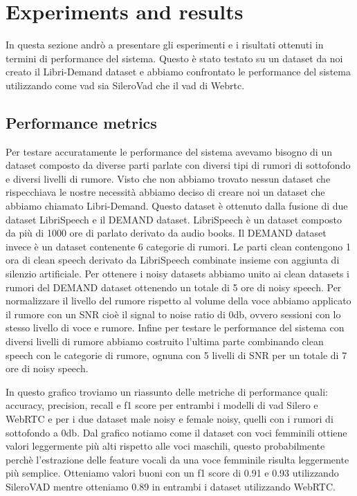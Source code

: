 \documentclass[12pt]{article}
\begin{document}
\section{Experiments and results}

In questa sezione andrò a presentare gli esperimenti e i risultati ottenuti in termini di performance del sistema. Questo è stato testato su un dataset da noi creato il Libri-Demand dataset e abbiamo confrontato le performance del sistema utilizzando come vad sia SileroVad che il vad di Webrtc. 

\subsection{Performance metrics}

Per testare accuratamente le performance del sistema avevamo bisogno di un dataset composto da diverse parti parlate con diversi tipi di rumori di sottofondo e diversi livelli di rumore. Visto che non abbiamo trovato nessun dataset che rispecchiava le nostre necessità abbiamo deciso di creare noi un dataset che abbiamo chiamato Libri-Demand. Questo dataset è ottenuto dalla fusione di due dataset LibriSpeech e il DEMAND dataset. LibriSpeech è un dataset composto da più di 1000 ore di parlato derivato da audio books. Il DEMAND dataset invece è un dataset contenente 6 categorie di rumori.
Le parti clean contengono 1 ora di clean speech derivato da LibriSpeech combinate insieme con aggiunta di silenzio artificiale. Per ottenere i noisy datasets abbiamo unito ai clean datasets i rumori del DEMAND dataset ottenendo un totale di 5 ore di noisy speech. Per normalizzare il livello del rumore rispetto al volume della voce abbiamo applicato il rumore con un SNR cioè il signal to noise ratio di 0db, ovvero sessioni con lo stesso livello di voce e rumore. Infine per testare le performance del sistema con diversi livelli di rumore abbiamo costruito l'ultima parte combinando clean speech con le categorie di rumore, ognuna con 5 livelli di SNR per un totale di 7 ore di noisy speech.

In questo grafico troviamo un riassunto delle metriche di performance quali: accuracy, precision, recall e f1 score per entrambi i modelli di vad Silero e WebRTC e per i due dataset male noisy e female noisy, quelli con i rumori di sottofondo a 0db. Dal grafico notiamo come il dataset con voci femminili ottiene valori leggermente più alti rispetto alle voci maschili, questo probabilmente perchè l'estrazione delle feature vocali da una voce femminile risulta leggermente più semplice. Otteniamo valori buoni con un f1 score di 0.91 e 0.93 utilizzando SileroVAD mentre otteniamo 0.89 in entrambi i dataset utilizzando WebRTC. 
\end{document}
